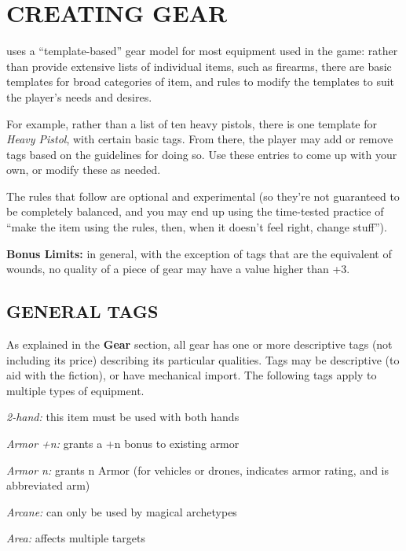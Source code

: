 \documentclass[oneside,10pt]{article}
\begin{document}
\section{CREATING GEAR}
\begin{multicols}{2}
\SW{} uses a “template-based” gear model for most
equipment used in the game: rather than provide extensive
lists of individual items, such as firearms, there are basic templates for broad categories of item, and rules to modify the
templates to suit the player’s needs and desires.

For example, rather than a list of ten heavy pistols, there is one
template for \textit{Heavy Pistol}, with certain basic tags. From there,
the player may add or remove tags based on the guidelines
for doing so. Use these entries to come up with your own, or
modify these as needed.

The rules that follow are optional and experimental (so they’re
not guaranteed to be completely balanced, and you may end
up using the time-tested practice of “make the item using the
rules, then, when it doesn’t feel right, change stuff”).

\begin{adjustwidth*}{.5cm}{.5cm}

\textbf{Bonus Limits:} in general, with the exception of tags that
are the equivalent of wounds, no quality of a piece of gear
may have a value higher than +3.
\end{adjustwidth*}

\subsection{GENERAL TAGS}
As explained in the \textbf{Gear} section, all gear has one or more descriptive tags (not including its price) describing its particular
qualities. Tags may be descriptive (to aid with the fiction), or
have mechanical import. The following tags apply to multiple
types of equipment.
\begin{adjustwidth*}{.5cm}{.5cm}

\textit{2-hand:} this item must be used with both hands

\textit{Armor +n:} grants a +n bonus to existing armor

\textit{Armor n:} grants n Armor (for vehicles or drones, indicates
armor rating, and is abbreviated arm)

\textit{Arcane:} can only be used by magical archetypes

\textit{Area:} affects multiple targets


\end{adjustwidth*}
\end{multicols}
\end{document}
